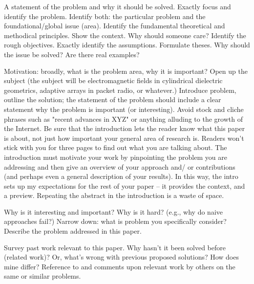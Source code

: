 A statement of the problem and why it should be solved.
Exactly focus and identify the problem.
Identify both: the particular problem and the foundational/global issue (area).
Identify the fundamental theoretical and methodical principles.
Show the context.
Why should someone care?
Identify the rough objectives.
Exactly identify the assumptions.
Formulate theses.
Why should the issue be solved?
Are there real examples?

Motivation: broadly, what is the problem area, why it is important? Open up the subject (the subject will be electromagnetic
fields in cylindrical dielectric geometrics, adaptive arrays in packet radio,
or whatever.)
Introduce problem, outline the solution; the statement of the problem should
include a clear statement why the problem is important (or interesting). Avoid
stock and cliche phrases such as "recent  advances in XYZ" or anything
alluding to the growth of the Internet. Be sure that the introduction lets
the reader know what this paper is about, not just how important your general
area of research is. Readers won't stick with you for three pages to find out
what you are talking about.
The introduction must motivate your work by pinpointing the problem you are
addressing and then give an overview of your approach and/ or contributions
(and perhaps even a general description of your results). In this way, the
intro sets up my expectations for the rest of your paper -- it provides the
context, and a preview. Repeating the abstract in the introduction is a waste
of space.


Why is it interesting and important? Why is it hard? (e.g., why do
naive approaches fail?) Narrow down: what is problem you specifically consider? Describe the problem addressed in this paper.

Survey past work relevant to this paper. Why hasn't it been solved before (related work)? Or, what's wrong with previous proposed solutions? How does mine differ? Reference to and comments upon relevant work by others on the same or similar problems.


